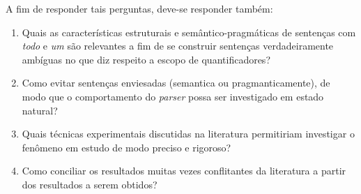 \noindent A fim de responder tais perguntas, deve-se responder também:

\begin{enumerate}[label=(\alph*)]
  \item Quais as características estruturais e semântico-pragmáticas de sentenças com \emph{todo} e \emph{um} são relevantes a fim de se construir sentenças verdadeiramente ambíguas no que diz respeito a escopo de quantificadores?
  \item Como evitar sentenças enviesadas (semantica ou pragmanticamente), de modo que o comportamento do \emph{parser} possa ser investigado em estado natural?
  \item Quais técnicas experimentais discutidas na literatura permitiriam investigar o fenômeno em estudo de modo preciso e rigoroso?
  \item Como conciliar os resultados muitas vezes conflitantes da literatura a partir dos resultados a serem obtidos?
\end{enumerate}
